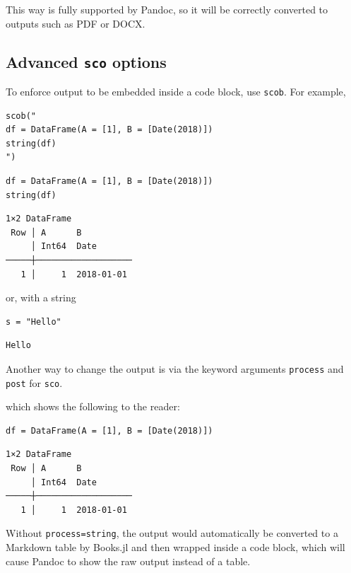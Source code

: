 \documentclass[
  14pt
  american,
  paper=a4,
  ,captions=tableheading
]{scrreprt}
\newcommand{\passthrough}[1]{#1}
\begin{document}
This way is fully supported by Pandoc, so it will be correctly converted
to outputs such as PDF or DOCX.

\hypertarget{advanced-sco-options}{%
\subsection{\texorpdfstring{Advanced \texttt{sco}
options}{Advanced sco options}}\label{advanced-sco-options}}

To enforce output to be embedded inside a code block, use
\passthrough{\lstinline!scob!}. For example,

\begin{lstlisting}
scob("
df = DataFrame(A = [1], B = [Date(2018)])
string(df)
")
\end{lstlisting}

\begin{lstlisting}
df = DataFrame(A = [1], B = [Date(2018)])
string(df)
\end{lstlisting}

\begin{lstlisting}
1×2 DataFrame
 Row │ A      B
     │ Int64  Date
─────┼───────────────────
   1 │     1  2018-01-01
\end{lstlisting}

or, with a string

\begin{lstlisting}
s = "Hello"
\end{lstlisting}

\begin{lstlisting}
Hello
\end{lstlisting}

Another way to change the output is via the keyword arguments
\passthrough{\lstinline!process!} and \passthrough{\lstinline!post!} for
\passthrough{\lstinline!sco!}.

which shows the following to the reader:

\begin{lstlisting}
df = DataFrame(A = [1], B = [Date(2018)])
\end{lstlisting}

\begin{lstlisting}
1×2 DataFrame
 Row │ A      B
     │ Int64  Date
─────┼───────────────────
   1 │     1  2018-01-01
\end{lstlisting}

Without \passthrough{\lstinline!process=string!}, the output would
automatically be converted to a Markdown table by Books.jl and then
wrapped inside a code block, which will cause Pandoc to show the raw
output instead of a table.
\end{document}
